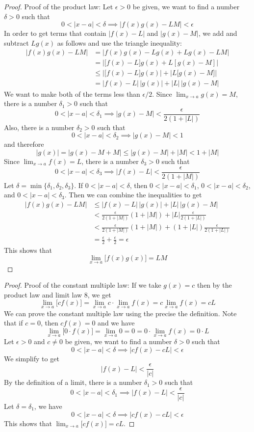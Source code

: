 \begin{proof}
    Proof of the product law:
    Let \(\epsilon>0\) be given,
    we want to find a number \(\delta>0\) such
    that \[0<|x-a|<\delta\implies|f(x)g(x)-LM|<\epsilon\]
    In order to get terms that contain \(|f(x)-L|\) and \(|g(x)-M|\),
    we add
    and subtract \(Lg(x)\) as follows and use the triangle inequality:
    \begin{align*}
        |f(x)g(x)-LM| &= |f(x)g(x)-Lg(x)+Lg(x)-LM| \\
        &= \left|\bigl[f(x)-L\bigr]g(x)+L[g(x)-M]\right| \\
        &\leq \left|\bigl[f(x)-L\bigr]g(x)\right|
        +\left|L\bigl[g(x)-M\bigr]\right| \\
        &= |f(x)-L|\,|g(x)|+|L|\,|g(x)-M|
    \end{align*}
    We want to make both of the terms less than \(\epsilon/2\).
    Since \(\displaystyle{\lim_{x\to a}g(x)=M}\),
    there is a number \(\delta_1>0\) such that
    \[0<|x-a|<\delta_1\implies|g(x)-M|<\frac{\epsilon}{2(1+|L|)}\]
    Also,
    there is a number \(\delta_2>0\) such that
    \[0<|x-a|<\delta_2\implies|g(x)-M|<1\] and therefore
    \[|g(x)|=|g(x)-M+M|\leq|g(x)-M|+|M|<1+|M|\]
    Since \(\displaystyle{\lim_{x\to a}f(x)=L}\),
    there is a number \(\delta_3>0\) such that
    \[0<|x-a|<\delta_3\implies|f(x)-L|<\frac{\epsilon}{2(1+|M|)}\]
    Let \(\delta=\min\{\delta_1,\delta_2,\delta_3\}\).
    If \(0<|x-a|<\delta\),
    then \(0<|x-a|<\delta_1\),
    \(0<|x-a|<\delta_2\),
    and \(0<|x-a|<\delta_3\).
    Then we can combine the inequalities to get
    \begin{align*}
        |f(x)g(x)-LM|
        &\leq |f(x)-L|\,|g(x)|+|L|\,|g(x)-M| \\
        &< \frac{\epsilon}{2(1+|M|)}(1+|M|)+|L|\frac{\epsilon}{2(1+|L|)} \\
        &< \frac{\epsilon}{2(1+|M|)}(1+|M|)
        +(1+|L|)\frac{\epsilon}{2(1+|L|)} \\
        &= \frac{\epsilon}{2}+\frac{\epsilon}{2}=\epsilon
    \end{align*}
    This shows that
    \[\lim_{x\to a}\bigl[f(x)g(x)\bigr]=LM\]
\end{proof}
\begin{proof}
    Proof of the constant multiple law:
    If we take \(g(x)=c\) then by the product law and limit law 8,
    we get
    \[\lim_{x\to a}\bigl[cf(x)\bigr]=\lim_{x\to a}c\cdot\lim_{x\to a}f(x)
    =c\lim_{x\to a}f(x)=cL\]
    We can prove the constant multiple law using the precise the definition.
    Note that if \(c=0\),
    then \(cf(x)=0\) and we have
    \[\lim_{x\to a}\bigl[0\cdot f(x)\bigr]=\lim_{x\to a}0=0
    =0\cdot\lim_{x\to a}f(x)=0\cdot L\]
    Let \(\epsilon>0\) and \(c\neq0\) be given,
    we want to find a number \(\delta>0\) such that
    \[0<|x-a|<\delta\implies|cf(x)-cL|<\epsilon\]
    We simplify to get
    \[|f(x)-L|<\frac{\epsilon}{|c|}\]
    By the definition of a limit,
    there is a number \(\delta_1>0\) such that
    \[0<|x-a|<\delta_1\implies|f(x)-L|<\frac{\epsilon}{|c|}\]
    Let \(\delta=\delta_1\),
    we have
    \[0<|x-a|<\delta\implies|cf(x)-cL|<\epsilon\]
    This shows that \(\displaystyle{\lim_{x\to a}\bigl[cf(x)\bigr]=cL}\).
\end{proof}
